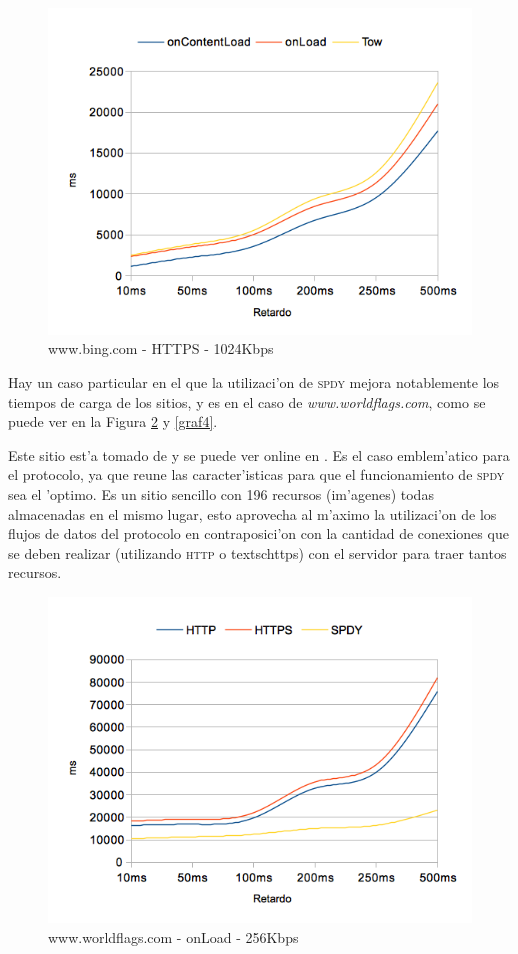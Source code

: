 \documentclass[a4paper,11pt,twocolumn]{article}
\begin{document}
\begin{figure}[h!]
  	\centering
	\includegraphics[scale=0.65]{exp1_2}
	\caption{\small www.bing.com - HTTPS - 1024Kbps}
	\label{graf2}
\end{figure}

Hay un caso particular en el que la utilizaci'on de \textsc{spdy} mejora notablemente los tiempos de carga de los sitios, y es en el caso de \emph{www.worldflags.com}, como se puede ver en la Figura \ref{graf3} y \ref{graf4}.

Este sitio est'a tomado de \cite{modspdyApache} y se puede ver online en \cite{flags}. Es el caso emblem'atico para el protocolo, ya que reune las caracter'isticas para que el funcionamiento de \textsc{spdy} sea el 'optimo. Es un sitio sencillo con 196 recursos (im'agenes) todas almacenadas en el mismo lugar, esto aprovecha al m'aximo la utilizaci'on de los flujos de datos del protocolo en contraposici'on con la cantidad de conexiones que se deben realizar (utilizando \textsc{http} o textsc{https}) con el servidor para traer tantos recursos.

\begin{figure}[h!]
  	\centering
	\includegraphics[scale=0.65]{exp1_3}
	\caption{\small www.worldflags.com - onLoad - 256Kbps}
	\label{graf3}
\end{figure}
\end{document}
